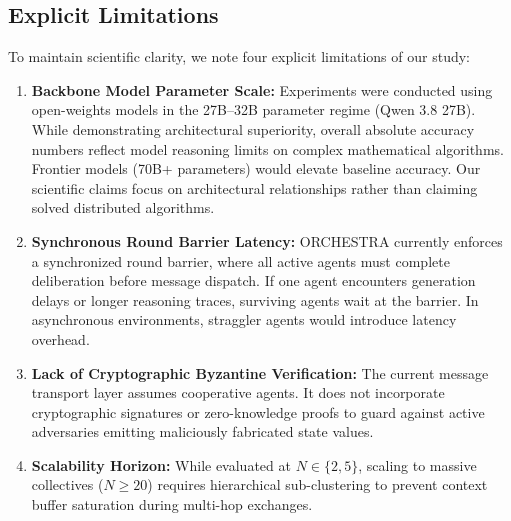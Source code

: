 \documentclass{ieeeaccess}
\begin{document}
\subsection{Explicit Limitations}
To maintain scientific clarity, we note four explicit limitations of our study:
\begin{enumerate}
    \item \textbf{Backbone Model Parameter Scale:} Experiments were conducted using open-weights models in the 27B--32B parameter regime (Qwen 3.8 27B). While demonstrating architectural superiority, overall absolute accuracy numbers reflect model reasoning limits on complex mathematical algorithms. Frontier models (70B+ parameters) would elevate baseline accuracy. Our scientific claims focus on architectural relationships rather than claiming solved distributed algorithms.
    \item \textbf{Synchronous Round Barrier Latency:} ORCHESTRA currently enforces a synchronized round barrier, where all active agents must complete deliberation before message dispatch. If one agent encounters generation delays or longer reasoning traces, surviving agents wait at the barrier. In asynchronous environments, straggler agents would introduce latency overhead.
    \item \textbf{Lack of Cryptographic Byzantine Verification:} The current message transport layer assumes cooperative agents. It does not incorporate cryptographic signatures or zero-knowledge proofs to guard against active adversaries emitting maliciously fabricated state values.
    \item \textbf{Scalability Horizon:} While evaluated at $N \in \{2, 5\}$, scaling to massive collectives ($N \ge 20$) requires hierarchical sub-clustering to prevent context buffer saturation during multi-hop exchanges.
\end{enumerate}
\end{document}

